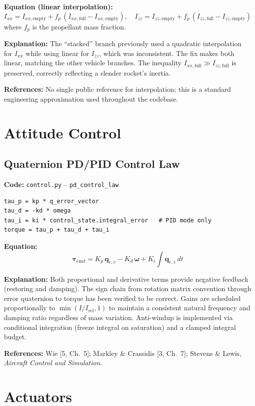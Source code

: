 \documentclass[12pt,a4paper]{article}
\begin{document}
\textbf{Equation (linear interpolation):}
\[
I_{xx} = I_{xx,\text{empty}} + f_p\,(I_{xx,\text{full}} - I_{xx,\text{empty}}),\quad
I_{zz} = I_{zz,\text{empty}} + f_p\,(I_{zz,\text{full}} - I_{zz,\text{empty}})
\]
where $f_p$ is the propellant mass fraction.

\textbf{Explanation:} The ``stacked'' branch previously used a quadratic interpolation for $I_{xx}$ while using linear for $I_{zz}$, which was inconsistent. The fix makes both linear, matching the other vehicle branches. The inequality $I_{xx,\text{full}} \gg I_{zz,\text{full}}$ is preserved, correctly reflecting a slender rocket's inertia.

\textbf{References:} No single public reference for interpolation; this is a standard engineering approximation used throughout the codebase.

\section{Attitude Control}

\subsection{Quaternion PD/PID Control Law}

\textbf{Code:} \texttt{control.py} – \texttt{pd\_control\_law}
\begin{verbatim}
tau_p = kp * q_error_vector
tau_d = -kd * omega
tau_i = ki * control_state.integral_error   # PID mode only
torque = tau_p + tau_d + tau_i
\end{verbatim}

\textbf{Equation:}
\[
\boldsymbol{\tau}_{\text{cmd}} = K_p\,\mathbf{q}_{e,v} - K_d\,\boldsymbol{\omega} + K_i\int \mathbf{q}_{e,v}\,dt
\]

\textbf{Explanation:} Both proportional and derivative terms provide negative feedback (restoring and damping). The sign chain from rotation matrix convention through error quaternion to torque has been verified to be correct. Gains are scheduled proportionally to $\min(I/I_{\text{ref}},1)$ to maintain a consistent natural frequency and damping ratio regardless of mass variation. Anti-windup is implemented via conditional integration (freeze integral on saturation) and a clamped integral budget.

\textbf{References:} Wie [5, Ch.~5]; Markley \& Crassidis [3, Ch.~7]; Stevens \& Lewis, \textit{Aircraft Control and Simulation}.

\section{Actuators}
\end{document}
